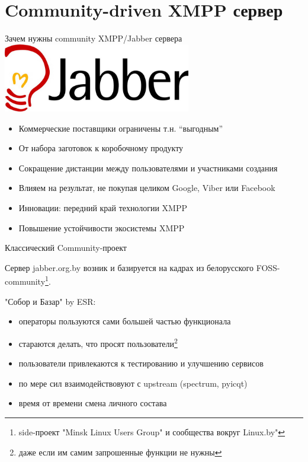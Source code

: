 \section{Community-driven XMPP сервер}

\begin{frame}{Зачем нужны community XMPP/Jabber сервера}
  \includegraphics[height=3cm]{jabber-logo}
  \begin{itemize}
    \item Коммерческие поставщики ограничены т.н. ``выгодным''
    \item От набора заготовок к коробочному продукту
    \item Сокращение дистанции между пользователями и участниками создания
    \item Влияем на результат, не покупая целиком Google, Viber или Facebook
    \item Инновации: передний край технологии XMPP
    \item Повышение устойчивости экосистемы XMPP
  \end{itemize}
\end{frame}

\begin{frame}{Классический Community-проект}

  Сервер jabber.org.by возник и базируется на кадрах из белорусского FOSS-community\footnote{side-проект "Minsk Linux Users Group" и сообщества вокруг Linux.by"}.

  "Собор и Базар" by ESR:
  \begin{itemize}
    \item операторы пользуются сами большей частью функционала
    \item стараются делать, что просят пользователи\footnote{даже если им самим запрошенные функции не нужны}
    \item пользователи привлекаются к тестированию и улучшению  сервисов
    \item по мере сил взаимодействовуют с upstream (spectrum, pyicqt)
    \item время от времени смена личного состава
  \end{itemize}
\end{frame}
